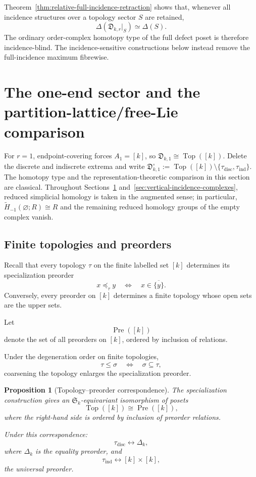 \documentclass[11pt]{article}
\theoremstyle{plain}
\newtheorem{proposition}[theorem]{Proposition}
\theoremstyle{definition}
\begin{document}
Theorem~\ref{thm:relative-full-incidence-retraction} shows that, whenever all incidence structures over a topology sector $S$ are retained,
\[
\Delta(\mathfrak D_{k,r}|_S)\simeq\Delta(S).
\]
The ordinary order-complex homotopy type of the full defect poset is therefore
incidence-blind.  The incidence-sensitive constructions below instead remove the
full-incidence maximum fibrewise.

\section{The one-end sector and the partition-lattice/free-Lie comparison}
\label{sec:lie-boundary}

For $r=1$, endpoint-covering forces $A_1=[k]$, so
$\mathfrak D_{k,1}\cong\operatorname{Top}([k])$.  Delete the discrete and indiscrete
extrema and write
$\mathfrak D_{k,1}^{\circ}:=\operatorname{Top}([k])\setminus
\{\tau_{\mathrm{disc}},\tau_{\mathrm{ind}}\}$.  The homotopy type and the
representation-theoretic comparison in this section are classical.  Throughout
Sections~\ref{sec:lie-boundary} and~\ref{sec:vertical-incidence-complexes}, reduced
simplicial homology is taken in the augmented sense; in particular,
$\widetilde H_{-1}(\varnothing;R)\cong R$ and the remaining reduced homology groups
of the empty complex vanish.

\subsection{Finite topologies and preorders}
\label{subsec:topologies-preorders}

Recall that every topology $\tau$ on the finite labelled set $[k]$
determines its specialization preorder
\[
x\preceq_\tau y
\quad\Longleftrightarrow\quad
x\in\overline{\{y\}}.
\]
Conversely, every preorder on $[k]$ determines a finite topology whose
open sets are the upper sets.

Let
\[
\operatorname{Pre}([k])
\]
denote the set of all preorders on $[k]$, ordered by inclusion of
relations.

Under the degeneration order on finite topologies,
\[
\tau\leq\sigma
\quad\Longleftrightarrow\quad
\sigma\subseteq\tau,
\]
coarsening the topology enlarges the specialization preorder.

\begin{proposition}[Topology--preorder correspondence]
\label{prop:topology-preorder-poset}
The specialization construction gives an
$\mathfrak S_k$-equivariant isomorphism of posets
\[
\operatorname{Top}([k])
\cong
\operatorname{Pre}([k]),
\]
where the right-hand side is ordered by inclusion of preorder relations.

Under this correspondence:
\[
\tau_{\mathrm{disc}}
\longleftrightarrow
\Delta_k,
\]
where $\Delta_k$ is the equality preorder, and
\[
\tau_{\mathrm{ind}}
\longleftrightarrow
[k]\times[k],
\]
the universal preorder.
\end{proposition}
\end{document}
